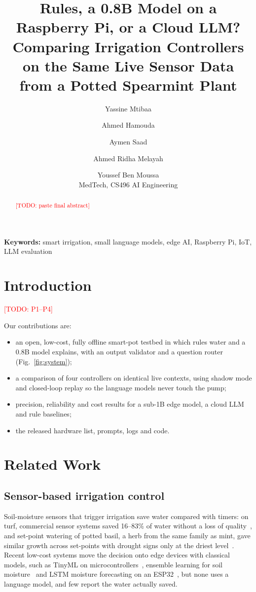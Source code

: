 \documentclass[10pt,twocolumn]{article}
\title{Rules, a 0.8B Model on a Raspberry Pi, or a Cloud LLM?\\ Comparing Irrigation Controllers on the Same Live Sensor Data from a Potted Spearmint Plant}
\author{Yassine Mtibaa \and Ahmed Hamouda \and Aymen Saad \and Ahmed Ridha Melayah \and Youssef Ben Moussa\\
MedTech, CS496 AI Engineering \todo{author order, emails}}
\date{}
\newcommand{\todo}[1]{\textcolor{red}{[TODO: #1]}}
\begin{document}
\maketitle

\begin{abstract}
\todo{paste final abstract}
\end{abstract}
\noindent\textbf{Keywords:} smart irrigation, small language models, edge AI, Raspberry Pi, IoT, LLM evaluation

\section{Introduction}\label{sec:intro}
\todo{P1--P4}

\noindent Our contributions are:
\begin{itemize}
  \item an open, low-cost, fully offline smart-pot testbed in which rules water and a 0.8B model explains, with an output validator and a question router (Fig.~\ref{fig:system});
  \item a comparison of four controllers on identical live contexts, using shadow mode and closed-loop replay so the language models never touch the pump;
  \item precision, reliability and cost results for a sub-1B edge model, a cloud LLM and rule baselines;
  \item the released hardware list, prompts, logs and code.
\end{itemize}

\section{Related Work}\label{sec:related}
\subsection{Sensor-based irrigation control}
Soil-moisture sensors that trigger irrigation save water compared with timers: on turf, commercial sensor systems saved 16--83\% of water without a loss of quality~\cite{CAR10}, and set-point watering of potted basil, a herb from the same family as mint, gave similar growth across set-points with drought signs only at the driest level~\cite{MON18}. Recent low-cost systems move the decision onto edge devices with classical models, such as TinyML on microcontrollers~\cite{TAU26}, ensemble learning for soil moisture~\cite{BER26} and LSTM moisture forecasting on an ESP32~\cite{KUN25}, but none uses a language model, and few report the water actually saved.
\end{document}
